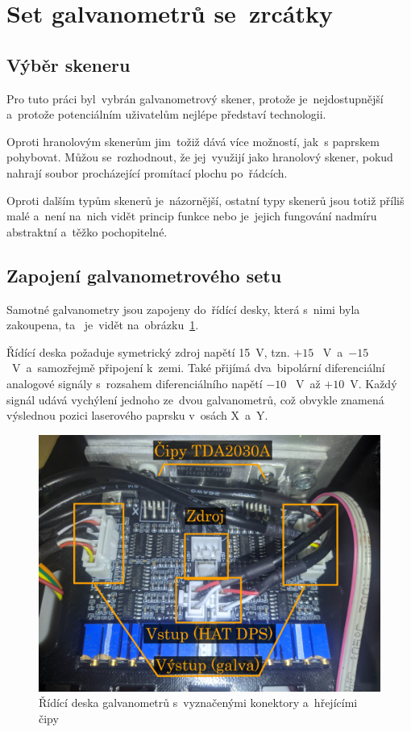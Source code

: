 \section{Set galvanometrů se~zrcátky} \label{sec:my-galvos}
\subsection{Výběr skeneru}
Pro tuto práci  byl~vybrán galvanometrový skener, protože je~nejdostupnější a~protože potenciálním uživatelům nejlépe představí technologii.

Oproti hranolovým skenerům  jim~tožiž dává více možností,  jak~s paprskem pohybovat.
Můžou se~rozhodnout, že  jej~využijí jako hranolový skener, pokud nahrají soubor procházející promítací plochu po~řádcích.

Oproti dalším typům skenerů je~názornější, ostatní typy skenerů jsou totiž příliš malé a~není na~nich vidět princip funkce nebo je~jejich fungování nadmíru abstraktní a~těžko pochopitelné.

\subsection{Zapojení galvanometrového setu}
Samotné galvanometry jsou zapojeny do~řídící desky, která  s~nimi byla zakoupena, ta ~je~vidět na~obrázku~\ref{fig:hw_galvoboard}.

Řídící deska požaduje symetrický zdroj napětí 15~V, tzn. $+15$ ~V~a~$-15$ ~V~a~samozřejmě připojení  k~zemi. Také přijímá  dva~bipolární diferenciální analogové signály s~rozsahem diferenciálního napětí $-10$ ~V~až $+10$~V. Každý signál udává vychýlení jednoho ze~dvou galvanometrů, což obvykle znamená výslednou pozici laserového paprsku v~osách X~a~Y.

\begin{figure}[htb]
  \centering
  \includegraphics[width=1\textwidth]{img/hw_galvoboard.jpg}
  \caption{\label{fig:hw_galvoboard} Řídící deska galvanometrů  s~vyznačenými konektory  a~hřejícími čipy}
\end{figure}

